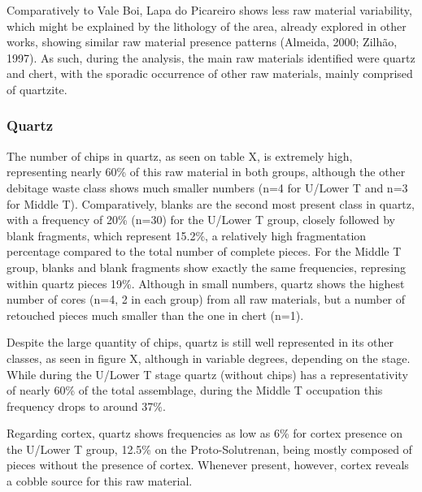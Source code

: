 \documentclass[12pt,twoside]{reedthesis}
\begin{document}
Comparatively to Vale Boi, Lapa do Picareiro shows less raw material variability, which might be explained by the lithology of the area, already explored in other works, showing similar raw material presence patterns (Almeida, 2000; Zilhão, 1997). As such, during the analysis, the main raw materials identified were quartz and chert, with the sporadic occurrence of other raw materials, mainly comprised of quartzite.

\hypertarget{quartz-1}{%
\subsubsection{Quartz}\label{quartz-1}}

The number of chips in quartz, as seen on table X, is extremely high, representing nearly 60\% of this raw material in both groups, although the other debitage waste class shows much smaller numbers (n=4 for U/Lower T and n=3 for Middle T). Comparatively, blanks are the second most present class in quartz, with a frequency of 20\% (n=30) for the U/Lower T group, closely followed by blank fragments, which represent 15.2\%, a relatively high fragmentation percentage compared to the total number of complete pieces. For the Middle T group, blanks and blank fragments show exactly the same frequencies, represing within quartz pieces 19\%. Although in small numbers, quartz shows the highest number of cores (n=4, 2 in each group) from all raw materials, but a number of retouched pieces much smaller than the one in chert (n=1).

Despite the large quantity of chips, quartz is still well represented in its other classes, as seen in figure X, although in variable degrees, depending on the stage. While during the U/Lower T stage quartz (without chips) has a representativity of nearly 60\% of the total assemblage, during the Middle T occupation this frequency drops to around 37\%.

Regarding cortex, quartz shows frequencies as low as 6\% for cortex presence on the U/Lower T group, 12.5\% on the Proto-Solutrenan, being mostly composed of pieces without the presence of cortex. Whenever present, however, cortex reveals a cobble source for this raw material.
\end{document}
